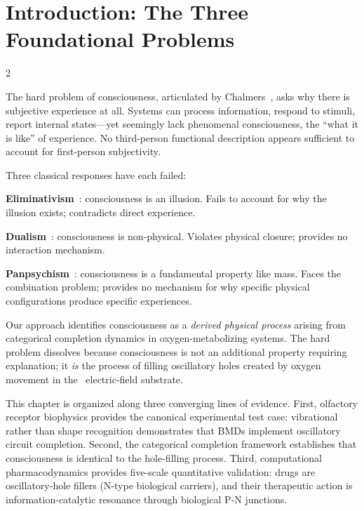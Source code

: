\section{Introduction: The Three Foundational Problems}
\label{sec:cc_intro}

\begin{multicols}{2}

The hard problem of consciousness, articulated by Chalmers~\citep{chalmers1995facing},
asks why there is subjective experience at all.  Systems can process information,
respond to stimuli, report internal states---yet seemingly lack phenomenal
consciousness, the ``what it is like'' of experience.  No third-person functional
description appears sufficient to account for first-person subjectivity.

Three classical responses have each failed:

\textbf{Eliminativism}~\citep{dennett1991consciousness}: consciousness is an
illusion.  Fails to account for why the illusion exists; contradicts direct
experience.

\textbf{Dualism}~\citep{chalmers1996conscious}: consciousness is non-physical.
Violates physical closure; provides no interaction mechanism.

\textbf{Panpsychism}~\citep{tononi2016integrated}: consciousness is a fundamental
property like mass.  Faces the combination problem; provides no mechanism for
why specific physical configurations produce specific experiences.

Our approach identifies consciousness as a \emph{derived physical process}
arising from categorical completion dynamics in oxygen-metabolizing systems.
The hard problem dissolves because consciousness is not an additional property
requiring explanation; it \emph{is} the process of filling oscillatory holes
created by oxygen movement in the \Hplus\ electric-field substrate.

This chapter is organized along three converging lines of evidence.  First,
olfactory receptor biophysics provides the canonical experimental test case:
vibrational rather than shape recognition demonstrates that BMDs implement
oscillatory circuit completion.  Second, the categorical completion framework
establishes that consciousness is identical to the hole-filling process.
Third, computational pharmacodynamics provides five-scale quantitative
validation: drugs are oscillatory-hole fillers (N-type biological carriers),
and their therapeutic action is information-catalytic resonance through
biological P-N junctions.

\end{multicols}

